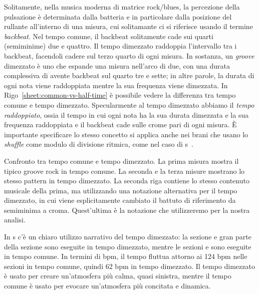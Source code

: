 \documentclass[class=book, crop=false, oneside, 12pt]{standalone}
\begin{document}
    Solitamente, nella musica moderna di matrice rock/blues, la percezione della pulsazione  è determinata dalla batteria e in particolare dalla posizione del rullante all'interno di una misura, cui solitamante ci si riferisce usando il termine \emph{backbeat}. Nel tempo comune, il backbeat solitamente cade  sui quarti (semiminime) due e quattro. Il tempo dimezzato raddoppia l'intervallo tra i backbeat, facendoli cadere sul terzo quarto di ogni misura. In sostanza, un \emph{groove} dimezzato è uno che espande una misura nell'arco di due, con una durata complessiva di  avente backbeat sul quarto tre e sette; in altre parole, la durata di ogni nota viene raddoppiata mentre la sua frequenza viene dimezzata. In Rigo~\ref{sheet:common-vs-half-time} è possibile vedere la differenza tra tempo comune e tempo dimezzato. Specularmente al tempo dimezzato abbiamo il \emph{tempo raddoppiato}, ossia il tempo in cui ogni nota ha la sua durata dimezzata e la sua frequenza raddoppiata e il backbeat cade sulle crome pari di ogni misura. È importante specificare lo stesso concetto si applica anche nei brani che usano lo \emph{shuffle} come modulo di divisione ritmica, come nel caso di \acrshort{s}~\cite{randel2003harvard}.

    \begin{sheet}[htb]
        \centering
        \caption[Confronto tra tempo comune e tempo dimezzato.]{Confronto tra tempo comune e tempo dimezzato. La prima misura mostra il tipico groove rock in tempo comune. La seconda e la terza misure mostrano lo stesso pattern in tempo dimezzato. La seconda riga contiene lo stesso contenuto musicale della prima, ma utilizzando una notazione alternativa per il tempo dimezzato, in cui viene esplicitamente cambiato il battuto di riferimento da semiminima a croma. Quest'ultima è la notazione che utilizzeremo per la nostra analisi.}
        \label{sheet:common-vs-half-time}
    \end{sheet}

    In \acrshort{s} c'è un chiaro utilizzo narrativo del tempo dimezzato: la sezione  e gran parte della sezione  sono eseguite in tempo dimezzato, mentre le sezioni  e  sono eseguite in tempo comune. In termini di bpm, il tempo fluttua attorno ai 124 bpm nelle sezioni in tempo comune, quindi 62 bpm in tempo dimezzato. Il tempo dimezzato è usato per creare un'atmosfera più calma, quasi sinistra, mentre il tempo comune è usato per evocare un'atmosfera più concitata e dinamica.
\end{document}
